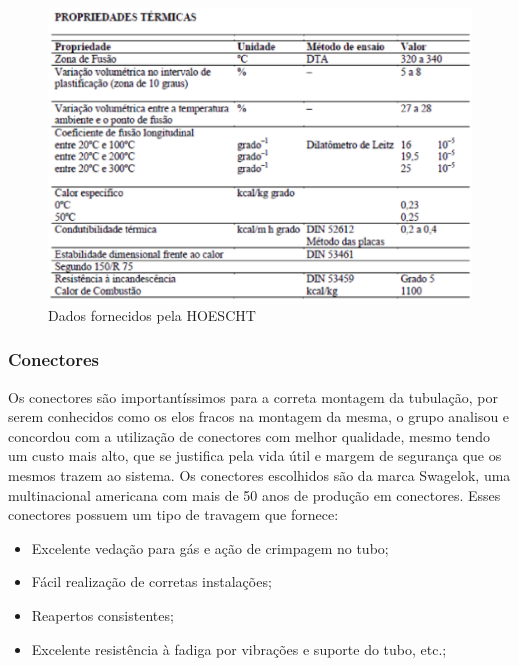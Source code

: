 \begin{figure}[!htb]                                                               
   \centering                                                                      
   \includegraphics[scale=0.6, keepaspectratio=true]{figuras/tabela2.eps} 
   \caption{Dados fornecidos pela HOESCHT}              
\end{figure}

\subsubsection{Conectores}

Os conectores são importantíssimos para a correta montagem da tubulação, por serem conhecidos como os elos fracos na montagem da mesma, o grupo analisou e concordou com a utilização de conectores com melhor qualidade, mesmo tendo um custo mais alto, que se justifica pela vida útil e margem de segurança que os mesmos trazem ao sistema.
Os conectores escolhidos são da marca Swagelok, uma multinacional americana com mais de 50 anos de produção em conectores. Esses conectores possuem um tipo de travagem que fornece:
\begin{itemize}
\item Excelente vedação para gás e ação de crimpagem no tubo;
\item Fácil realização de corretas instalações;
\item Reapertos consistentes; 
\item Excelente resistência à fadiga por vibrações e suporte do tubo, etc.;
\end{itemize}

